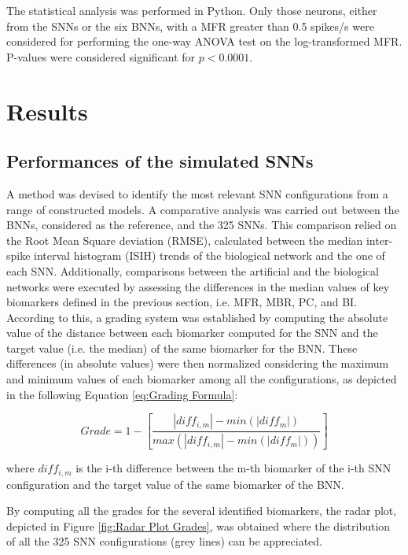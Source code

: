 The statistical analysis was performed in Python. Only those neurons, either from the SNNs or the six BNNs, with a MFR greater than 0.5 spikes/s were considered for performing the one-way ANOVA test on the log-transformed MFR. P-values were considered significant for $p<0.0001$.

\section{Results}

\subsection{Performances of the simulated SNNs}

A method was devised to identify the most relevant SNN configurations from a range of constructed models. A comparative analysis was carried out between the BNNs, considered as the reference, and the 325 SNNs. This comparison relied on the Root Mean Square deviation (RMSE), calculated between the median inter-spike interval histogram (ISIH) trends of the biological network and the one of each SNN. Additionally, comparisons between the artificial and the biological networks were executed by assessing the differences in the median values of key biomarkers defined in the previous section, i.e. MFR, MBR, PC, and BI. According to this, a grading system was established by computing the absolute value of the distance between each biomarker computed for the SNN and the target value (i.e. the median) of the same biomarker for the BNN. These differences (in absolute values) were then normalized considering the maximum and minimum values of each biomarker among all the configurations, as depicted in the following Equation \ref{eq:Grading Formula}:

\begin{equation}
Grade = 1 - \left[\frac{\left|diff_{i,m}\right|-min(\left|diff_{m}\right|)}{max(\left|diff_{i,m}\right|-min(\left|diff_{m}\right|))}\right] 
\label{eq:Grading Formula}
\end{equation}

where $diff_{i,m}$ is the i-th difference between the m-th biomarker of the i-th SNN configuration and the target value of the same biomarker of the BNN.

By computing all the grades for the several identified biomarkers, the radar plot, depicted in Figure \ref{fig:Radar Plot Grades}, was obtained where the distribution of all the 325 SNN configurations (grey lines) can be appreciated. 

